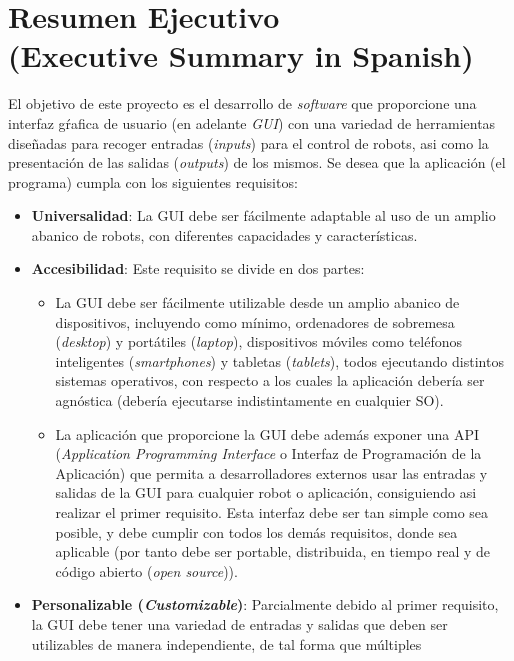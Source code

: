 \chapter*{Resumen Ejecutivo\\(Executive Summary in Spanish)}

El objetivo de este proyecto es el desarrollo de \textit{software} que proporcione una interfaz gŕafica de usuario (en adelante 
\textit{GUI}) con una variedad de herramientas diseñadas para recoger entradas (\textit{inputs}) para el control de robots, asi 
como la presentación de las salidas (\textit{outputs}) de los mismos. Se desea que la aplicación (el programa) cumpla con los 
siguientes requisitos:
\begin{itemize}
	\item \textbf{Universalidad}: La GUI debe ser fácilmente adaptable al uso de un amplio abanico de robots, con diferentes 
	capacidades y características.
	\item \textbf{Accesibilidad}: Este requisito se divide en dos partes:
	\begin{itemize}
		\item La GUI debe ser fácilmente utilizable desde un amplio abanico de dispositivos, incluyendo como mínimo, 
		ordenadores de sobremesa (\textit{desktop}) y portátiles (\textit{laptop}), dispositivos móviles como teléfonos 
		inteligentes (\textit{smartphones}) y tabletas (\textit{tablets}), todos ejecutando distintos sistemas operativos, con 
		respecto a los cuales la aplicación debería ser agnóstica (debería ejecutarse indistintamente en cualquier SO).		
		\item La aplicación que proporcione la GUI debe además exponer una API (\textit{Application Programming Interface} o 
		Interfaz de Programación de la Aplicación) que permita a desarrolladores externos usar las entradas y salidas de la GUI 
		para cualquier robot o aplicación, consiguiendo asi realizar el primer requisito. Esta interfaz debe ser tan simple 
		como sea posible, y debe cumplir con todos los demás requisitos, donde sea aplicable (por tanto debe ser portable, 
		distribuida, en tiempo real y de código abierto (\textit{open source})).
	\end{itemize}
	\item \textbf{Personalizable (\textit{Customizable})}: Parcialmente debido al primer requisito, la GUI debe tener una 
	variedad de entradas y salidas que deben ser utilizables de manera independiente, de tal forma que múltiples 

\end{itemize}
